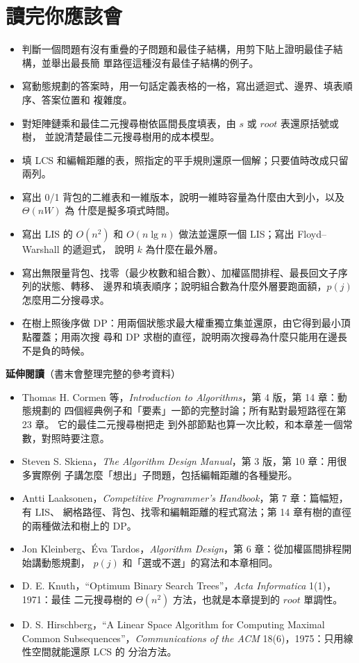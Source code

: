 \section{讀完你應該會}
\label{sec:dp-checklist}

\begin{itemize}
\item 判斷一個問題有沒有重疊的子問題和最佳子結構，用剪下貼上證明最佳子結構，並舉出最長簡
單路徑這種沒有最佳子結構的例子。
\item 寫動態規劃的答案時，用一句話定義表格的一格，寫出遞迴式、邊界、填表順序、答案位置和
複雜度。
\item 對矩陣鏈乘和最佳二元搜尋樹依區間長度填表，由 $s$ 或 $\mathit{root}$ 表還原括號或樹，
並說清楚最佳二元搜尋樹用的成本模型。
\item 填 LCS 和編輯距離的表，照指定的平手規則還原一個解；只要值時改成只留兩列。
\item 寫出 0/1 背包的二維表和一維版本，說明一維時容量為什麼由大到小，以及 $\Theta(nW)$ 為
什麼是擬多項式時間。
\item 寫出 LIS 的 $O(n^2)$ 和 $O(n \lg n)$ 做法並還原一個 LIS；寫出 Floyd--Warshall 的遞迴式，
說明 $k$ 為什麼在最外層。
\item 寫出無限量背包、找零（最少枚數和組合數）、加權區間排程、最長回文子序列的狀態、轉移、
邊界和填表順序；說明組合數為什麼外層要跑面額，$p(j)$ 怎麼用二分搜尋求。
\item 在樹上照後序做 DP：用兩個狀態求最大權重獨立集並還原，由它得到最小頂點覆蓋；用兩次搜
尋和 DP 求樹的直徑，說明兩次搜尋為什麼只能用在邊長不是負的時候。
\end{itemize}

\textbf{延伸閱讀}（書末會整理完整的參考資料）

\begin{itemize}
\item Thomas H. Cormen 等，\textit{Introduction to Algorithms}，第 4 版，第 14 章：動態規劃的
四個經典例子和「要素」一節的完整討論；所有點對最短路徑在第 23 章。 它的最佳二元搜尋樹把走
到外部節點也算一次比較，和本章差一個常數，對照時要注意。
\item Steven S. Skiena，\textit{The Algorithm Design Manual}，第 3 版，第 10 章：用很多實際例
子講怎麼「想出」子問題，包括編輯距離的各種變形。
\item Antti Laaksonen，\textit{Competitive Programmer's Handbook}，第 7 章：篇幅短，有 LIS、
網格路徑、背包、找零和編輯距離的程式寫法；第 14 章有樹的直徑的兩種做法和樹上的 DP。
\item Jon Kleinberg、\'Eva Tardos，\textit{Algorithm Design}，第 6 章：從加權區間排程開始講動態規劃，
$p(j)$ 和「選或不選」的寫法和本章相同。
\item D. E. Knuth，``Optimum Binary Search Trees''，\textit{Acta Informatica} 1(1)，1971：最佳
二元搜尋樹的 $\Theta(n^2)$ 方法，也就是本章提到的 $\mathit{root}$ 單調性。
\item D. S. Hirschberg，``A Linear Space Algorithm for Computing Maximal Common
Subsequences''，\textit{Communications of the ACM} 18(6)，1975：只用線性空間就能還原 LCS 的
分治方法。
\end{itemize}

